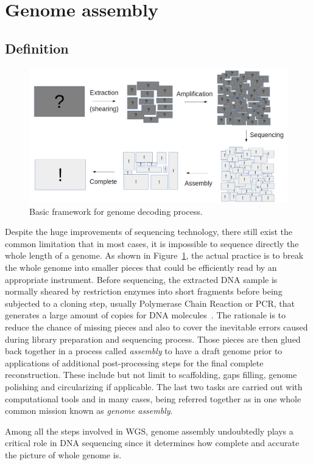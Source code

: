 \section{Genome assembly}
\subsection{Definition}
\begin{figure}[ht!]
\centering
\includegraphics[width=.9\textwidth]{images/genome_decoding.png}
\caption{Basic framework for genome decoding process.} 
\label{Fig:decoding}
\end{figure}

Despite the huge improvements of sequencing technology, there still exist the common limitation that in most cases, it is impossible to sequence directly the whole length of a genome. As shown in Figure~\ref{Fig:decoding}, the actual practice is to break the whole genome into smaller pieces that could be efficiently read by an appropriate instrument. 
Before sequencing, the extracted DNA sample is normally sheared by restriction enzymes into short fragments before being subjected to a cloning step, usually Polymerase Chain Reaction or PCR, that generates a large amount of copies for DNA molecules~\cite{Garibyan2013research}. The rationale is to reduce the chance of missing pieces and also to cover the inevitable errors caused during library preparation and sequencing process. 
Those pieces are then glued back together in a process called \emph{assembly} to have a draft genome prior to applications of additional post-processing steps for the final complete reconstruction.  
These include but not limit to scaffolding, gaps filling, genome polishing and circularizing if applicable.
The last two tasks are carried out with computational tools and in many cases, being referred together as in one whole common mission known as \emph{genome assembly}. 

Among all the steps involved in WGS, genome assembly undoubtedly plays a critical role in DNA sequencing since it determines how complete and accurate the picture of whole genome is. 



